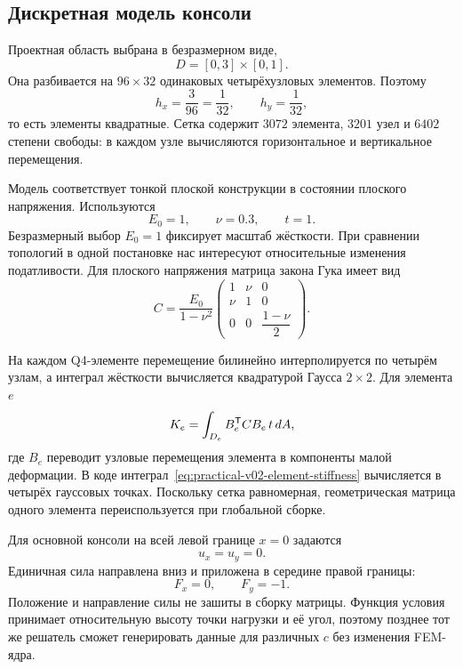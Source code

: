 \subsection{Дискретная модель консоли}
\label{subsec:practical-v02-cantilever}

Проектная область выбрана в безразмерном виде,
\begin{equation}
\label{eq:practical-v02-domain}
 D=[0,3]\times[0,1].
\end{equation}
Она разбивается на $96\times32$ одинаковых четырёхузловых элементов. Поэтому
\begin{equation}
 h_x=\frac{3}{96}=\frac{1}{32},
 \qquad
 h_y=\frac{1}{32},
\end{equation}
то есть элементы квадратные. Сетка содержит $3072$ элемента, $3201$ узел и $6402$ степени свободы: в каждом узле вычисляются горизонтальное и вертикальное перемещения.

Модель соответствует тонкой плоской конструкции в состоянии плоского напряжения. Используются
\begin{equation}
\label{eq:practical-v02-material}
 E_0=1,
 \qquad
 \nu=0.3,
 \qquad
 t=1.
\end{equation}
Безразмерный выбор $E_0=1$ фиксирует масштаб жёсткости. При сравнении топологий в одной постановке нас интересуют относительные изменения податливости. Для плоского напряжения матрица закона Гука имеет вид
\begin{equation}
\label{eq:practical-v02-plane-stress}
 C
 =
 \frac{E_0}{1-\nu^2}
 \begin{pmatrix}
  1 & \nu & 0\\
  \nu & 1 & 0\\
  0 & 0 & \dfrac{1-\nu}{2}
 \end{pmatrix}.
\end{equation}

На каждом Q4-элементе перемещение билинейно интерполируется по четырём узлам, а интеграл жёсткости вычисляется квадратурой Гаусса $2\times2$. Для элемента $e$
\begin{equation}
\label{eq:practical-v02-element-stiffness}
 K_e
 =
 \int_{D_e}
 B_e^{\mathsf{T}} C B_e\, t\, dA,
\end{equation}
где $B_e$ переводит узловые перемещения элемента в компоненты малой деформации. В коде интеграл~\eqref{eq:practical-v02-element-stiffness} вычисляется в четырёх гауссовых точках. Поскольку сетка равномерная, геометрическая матрица одного элемента переиспользуется при глобальной сборке.

Для основной консоли на всей левой границе $x=0$ задаются
\begin{equation}
\label{eq:practical-v02-cantilever-bc}
 u_x=u_y=0.
\end{equation}
Единичная сила направлена вниз и приложена в середине правой границы:
\begin{equation}
\label{eq:practical-v02-cantilever-load}
 F_x=0,
 \qquad
 F_y=-1.
\end{equation}
Положение и направление силы не зашиты в сборку матрицы. Функция условия принимает относительную высоту точки нагрузки и её угол, поэтому позднее тот же решатель сможет генерировать данные для различных $c$ без изменения FEM-ядра.

